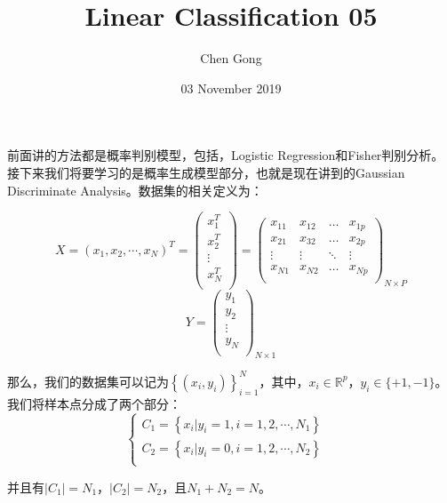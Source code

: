 \documentclass[a4paper]{article}
\title{Linear Classification 05}
\author{Chen Gong}
\date{03 November 2019}
\begin{document}
\maketitle

前面讲的方法都是概率判别模型，包括，Logistic Regression和Fisher判别分析。接下来我们将要学习的是概率生成模型部分，也就是现在讲到的Gaussian Discriminate Analysis。数据集的相关定义为：

\begin{equation}
    X=(x_1, x_2, \cdots, x_N)^T=
    \begin{pmatrix}
    x_1^T \\ 
    x_2^T \\
    \vdots\\
    x_N^T \\
    \end{pmatrix} =
    \begin{pmatrix}
    x_{11} & x_{12} & \dots & x_{1p}\\
    x_{21} & x_{32} & \dots & x_{2p}\\
    \vdots & \vdots & \ddots & \vdots\\
    x_{N1} & x_{N2} & \dots & x_{Np}\\
    \end{pmatrix}_{N\times P}
\end{equation}
\begin{equation}
    Y=
    \begin{pmatrix}
    y_1 \\ 
    y_2 \\
    \vdots\\
    y_N \\
    \end{pmatrix}_{N\times 1}
\end{equation}

那么，我们的数据集可以记为$\left\{ (x_i,y_i) \right\}_{i=1}^N$，其中，$x_i \in \mathbb{R}^p$，$y_i\in\{+1,-1\}$。我们将样本点分成了两个部分：
\begin{equation}
    \left\{
        \begin{array}{ll}
            C_1 = \left\{ x_i|y_i=1, i=1,2,\cdots,N_1 \right\} & \\
            C_2 = \left\{ x_i|y_i=0, i=1,2,\cdots,N_2 \right\} & \\
        \end{array}
    \right.
\end{equation}

并且有$|C_1|=N_1$，$|C_2|=N_2$，且$N_1+N_2=N$。
\end{document}
